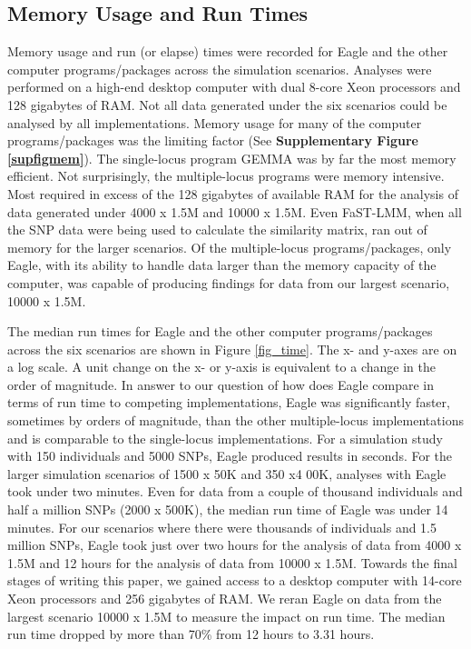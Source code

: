 \documentclass{article}
\begin{document}
 



\subsection{Memory Usage and Run Times}

Memory usage and run (or elapse) times were recorded for Eagle and the other computer programs/packages across the simulation scenarios. 
Analyses were performed on a high-end desktop computer with dual 8-core Xeon processors and 128 gigabytes of RAM. Not all data generated under the six scenarios could be analysed by all implementations. Memory usage 
for many of the computer programs/packages was the limiting factor (See {\bf Supplementary Figure \ref{supfigmem}}).  The single-locus program GEMMA was by 
far the most memory efficient. Not surprisingly, the multiple-locus programs were memory intensive. Most required in 
excess of the 128 gigabytes of available RAM for the analysis of data generated under 4000 x 1.5M and 10000 x 1.5M.  
Even FaST-LMM, when all the SNP data were being used to calculate the similarity matrix, ran out of memory for the larger scenarios.
Of the multiple-locus programs/packages, only Eagle,  
with its ability to handle data larger than the memory capacity of the computer, was capable of producing findings 
for data from our largest scenario, 10000 x 1.5M. 



The median run times for Eagle and the other computer programs/packages across the six scenarios are shown in Figure \ref{fig_time}. 
The x- and y-axes are on a log scale.  A unit change on the x- or y-axis is equivalent to a change in the order of magnitude.  
In answer to our question of how does Eagle compare in terms of run time to competing implementations, 
Eagle was significantly faster, sometimes by orders of magnitude,  than the other multiple-locus
 implementations and is comparable to the single-locus implementations. For a simulation study with 150 individuals and 
 5000 SNPs, Eagle produced results in seconds.  For the larger simulation scenarios of 1500 x  50K and 350 x4 00K, 
 analyses with Eagle took under two minutes. Even for data from a couple of thousand individuals and half a million 
 SNPs (2000 x 500K), the median run time of Eagle was under 14 minutes. For our scenarios where there 
 were thousands of individuals and 1.5 million SNPs, Eagle took just over two hours for the analysis of data from 
 4000 x 1.5M and  12 hours for the analysis of data from 10000 x 1.5M. 
 Towards the final stages of writing this paper, 
 we gained access to a desktop computer with 14-core Xeon processors and 256 gigabytes of RAM. We reran Eagle on data from the largest
  scenario 10000 x 1.5M to measure the impact on run time. The median run time dropped by more than 70\% 
  from 12 hours to 3.31 hours. 
 
\end{document}
